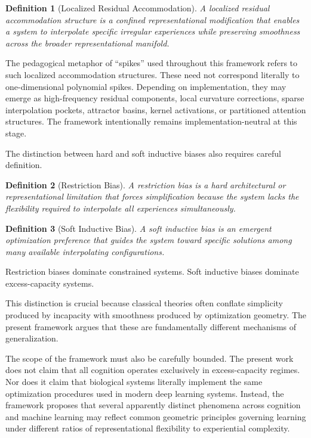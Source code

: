 \documentclass[12pt,a4paper]{article}
\newtheorem{definition}{Definition}[section]
\begin{document}
\begin{definition}[Localized Residual Accommodation]
A localized residual accommodation structure is a confined representational modification that enables a system to interpolate specific irregular experiences while preserving smoothness across the broader representational manifold.
\end{definition}

The pedagogical metaphor of ``spikes'' used throughout this framework refers to such localized accommodation structures. These need not correspond literally to one-dimensional polynomial spikes. Depending on implementation, they may emerge as high-frequency residual components, local curvature corrections, sparse interpolation pockets, attractor basins, kernel activations, or partitioned attention structures. The framework intentionally remains implementation-neutral at this stage.

The distinction between hard and soft inductive biases also requires careful definition.

\begin{definition}[Restriction Bias]
A restriction bias is a hard architectural or representational limitation that forces simplification because the system lacks the flexibility required to interpolate all experiences simultaneously.
\end{definition}

\begin{definition}[Soft Inductive Bias]
A soft inductive bias is an emergent optimization preference that guides the system toward specific solutions among many available interpolating configurations.
\end{definition}

Restriction biases dominate constrained systems. Soft inductive biases dominate excess-capacity systems.

This distinction is crucial because classical theories often conflate simplicity produced by incapacity with smoothness produced by optimization geometry. The present framework argues that these are fundamentally different mechanisms of generalization.

The scope of the framework must also be carefully bounded. The present work does not claim that all cognition operates exclusively in excess-capacity regimes. Nor does it claim that biological systems literally implement the same optimization procedures used in modern deep learning systems. Instead, the framework proposes that several apparently distinct phenomena across cognition and machine learning may reflect common geometric principles governing learning under different ratios of representational flexibility to experiential complexity.
\end{document}
